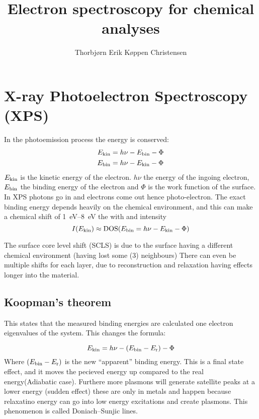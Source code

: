 \documentclass[article,oneside]{memoir}
\title{Electron spectroscopy for chemical analyses}
\author{Thorbjørn Erik Køppen Christensen}
\begin{document}
\maketitle
\chapter{X-ray Photoelectron Spectroscopy (XPS)}

In the photoemission process the energy is conserved:
\begin{align*}
        E_{\textup{kin}}&=h\nu -E_{\textup{bin}} -\Phi\\
        E_{\textup{bin}}&=h\nu - E_{\textup{kin}} -\Phi
\end{align*}
$E_{\textup{kin}}$ is the kinetic energy of the electron. $h\nu$ the energy of the ingoing electron, $E_{\textup{bin}}$ the binding energy of the electron and $\Phi$ is the work function of the surface.
In XPS photons go in and electrons come out hence photo-electron. The exact binding energy depends heavily on the chemical environment, and this can make a chemical shift of \SIrange{1}{8}{\eV} the with and intensity 
$$I(E_{\textup{kin}})\approx\textup{DOS}(E_{\textup{bin}}=h\nu-E_{\textup{kin}}-\Phi)$$

The surface core level shift (SCLS) is due to the surface having a different chemical environment (having lost some (3) neighbours) There can even be multiple shifts for each layer, due to reconstruction and relaxation having effects longer into the material.

\section{Koopman's theorem}
This states that the measured binding energies are calculated one electron eigenvalues of the system. This changes the formula:


\begin{equation*}
        E_{\textup{kin}}=h\nu-(E_{\textup{bin}}-E_{\textup{r}})-\Phi
\end{equation*}
Where $(E_{\textup{bin}}-E_{\textup{r}})$ is the new ``apparent'' binding energy.
This is a final state effect, and it moves the pecieved energy up compared to the real energy(Adiabatic case). Furthere more plasmons will generate satellite peaks at a lower energy (sudden effect) these are only in metals and happen because relaxatino energy can go into low energy excitations and create plasmons. This phenomenon is called Doniach--Sunjic lines.
\end{document}
